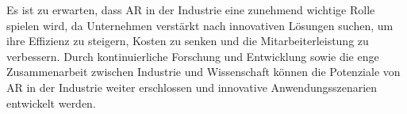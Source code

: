 Es ist zu erwarten, dass AR in der Industrie eine zunehmend wichtige Rolle
spielen wird, da Unternehmen verstärkt nach innovativen Lösungen suchen, um
ihre Effizienz zu steigern, Kosten zu senken und die Mitarbeiterleistung zu
verbessern. Durch kontinuierliche Forschung und Entwicklung sowie die enge
Zusammenarbeit zwischen Industrie und Wissenschaft können die Potenziale von AR
in der Industrie weiter erschlossen und innovative Anwendungsszenarien
entwickelt werden.